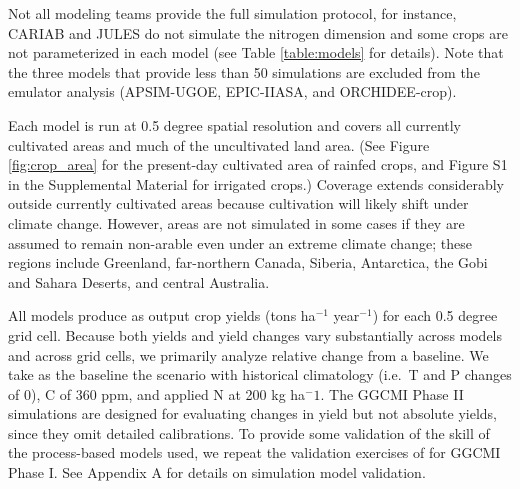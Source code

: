 \documentclass[esd, manuscript]{copernicus} %
\begin{document}

Not all modeling teams provide the full simulation protocol, for instance, CARIAB and JULES do not simulate the nitrogen dimension and some crops are not parameterized in each model (see Table \ref{table:models} for details). Note that the three models that provide less than 50 simulations are excluded from the emulator analysis (APSIM-UGOE, EPIC-IIASA, and ORCHIDEE-crop). 


Each model is run at 0.5 degree spatial resolution and covers all currently cultivated areas and much of the uncultivated land area. (See Figure \ref{fig:crop_area} for the present-day cultivated area of rainfed crops, and Figure S1 in the Supplemental Material for irrigated crops.)  Coverage extends considerably outside currently cultivated areas because cultivation will likely shift under climate change.  However, areas are not simulated in some cases if they are assumed to remain non-arable even under an extreme climate change; these regions include Greenland, far-northern Canada, Siberia, Antarctica, the Gobi and Sahara Deserts, and central Australia.  

All models produce as output crop yields (tons ha$^{-1}$ year$^{-1}$) for each 0.5 degree grid cell. Because both yields and yield changes vary substantially across models and across grid cells, we primarily analyze relative change from a baseline. We take as the baseline the scenario with historical climatology (i.e.\ T and P changes of 0), C of 360 ppm, and applied N at 200 kg ha$^-1$. The GGCMI Phase II simulations are designed for evaluating changes in yield but not absolute yields, since they omit detailed calibrations. To provide some validation of the skill of the process-based models used, we repeat the validation exercises of \citet{muller_global_2017} for GGCMI Phase I. See Appendix A for details on simulation model validation.
\end{document}
